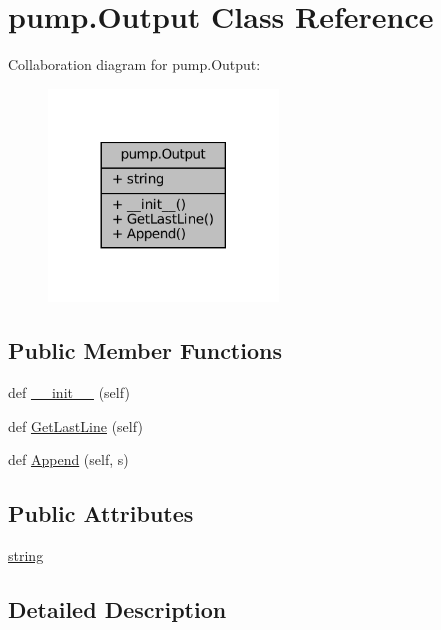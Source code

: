 \hypertarget{classpump_1_1Output}{}\section{pump.\+Output Class Reference}
\label{classpump_1_1Output}


Collaboration diagram for pump.\+Output\+:
\nopagebreak
\begin{figure}[H]
\begin{center}
\leavevmode
\includegraphics[width=173pt]{classpump_1_1Output__coll__graph}
\end{center}
\end{figure}
\subsection*{Public Member Functions}
\begin{DoxyCompactItemize}
\item 
def \hyperlink{classpump_1_1Output_a01a703055e40078561bd4a5011de4a6d}{\+\_\+\+\_\+init\+\_\+\+\_\+} (self)
\item 
def \hyperlink{classpump_1_1Output_a6ece94d24be171bae2a2234c052b4c58}{Get\+Last\+Line} (self)
\item 
def \hyperlink{classpump_1_1Output_a6f284bb3f80e03594bc28286c695f5a7}{Append} (self, s)
\end{DoxyCompactItemize}
\subsection*{Public Attributes}
\begin{DoxyCompactItemize}
\item 
\hyperlink{classpump_1_1Output_a8786848ab3d235189379c449a446f883}{string}
\end{DoxyCompactItemize}


\subsection{Detailed Description}


